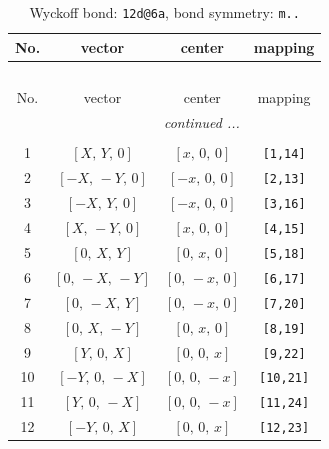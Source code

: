 \documentclass[fleqn,8pt]{jsarticle}
\begin{document}
\begin{longtable}{cccc}
\caption{Wyckoff bond: {\tt 12d@6a}, bond symmetry: {\tt m..}}
 \\
 \hline \hline
No. & vector & center & mapping \\ \hline \endfirsthead

\multicolumn{3}{l}{\tablename\ \thetable{}} \\
 \hline \hline
No. & vector & center & mapping \\ \hline \endhead

 \hline \hline
\multicolumn{3}{r}{\footnotesize\it continued ...} \\ \endfoot

 \hline \hline
\multicolumn{3}{r}{} \\ \endlastfoot

1 & $\left[ X,\, Y,\, 0 \right]$ & $\left[ x,\, 0,\, 0 \right]$ & {\tt [1,14]} \\ \hline
2 & $\left[ - X,\, - Y,\, 0 \right]$ & $\left[ - x,\, 0,\, 0 \right]$ & {\tt [2,13]} \\ \hline
3 & $\left[ - X,\, Y,\, 0 \right]$ & $\left[ - x,\, 0,\, 0 \right]$ & {\tt [3,16]} \\ \hline
4 & $\left[ X,\, - Y,\, 0 \right]$ & $\left[ x,\, 0,\, 0 \right]$ & {\tt [4,15]} \\ \hline
5 & $\left[ 0,\, X,\, Y \right]$ & $\left[ 0,\, x,\, 0 \right]$ & {\tt [5,18]} \\ \hline
6 & $\left[ 0,\, - X,\, - Y \right]$ & $\left[ 0,\, - x,\, 0 \right]$ & {\tt [6,17]} \\ \hline
7 & $\left[ 0,\, - X,\, Y \right]$ & $\left[ 0,\, - x,\, 0 \right]$ & {\tt [7,20]} \\ \hline
8 & $\left[ 0,\, X,\, - Y \right]$ & $\left[ 0,\, x,\, 0 \right]$ & {\tt [8,19]} \\ \hline
9 & $\left[ Y,\, 0,\, X \right]$ & $\left[ 0,\, 0,\, x \right]$ & {\tt [9,22]} \\ \hline
10 & $\left[ - Y,\, 0,\, - X \right]$ & $\left[ 0,\, 0,\, - x \right]$ & {\tt [10,21]} \\ \hline
11 & $\left[ Y,\, 0,\, - X \right]$ & $\left[ 0,\, 0,\, - x \right]$ & {\tt [11,24]} \\ \hline
12 & $\left[ - Y,\, 0,\, X \right]$ & $\left[ 0,\, 0,\, x \right]$ & {\tt [12,23]} \\
\end{longtable}
\renewcommand{\arraystretch}{1.2}
\end{document}
